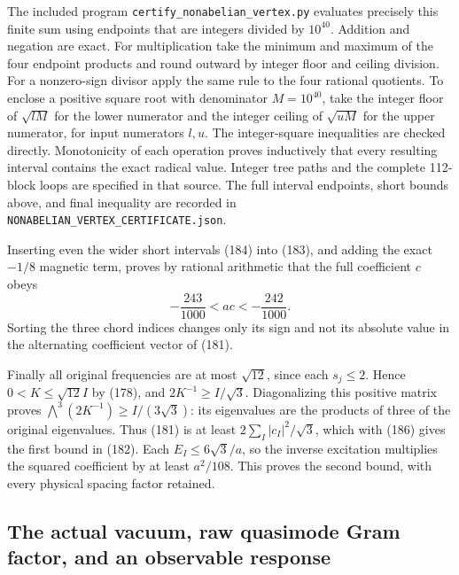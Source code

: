 \documentclass[11pt]{article}
\begin{document}
The included program \texttt{certify\_nonabelian\_vertex.py}
evaluates precisely this finite sum using endpoints that are integers
divided by $10^{40}$. Addition and negation are exact. For multiplication
take the minimum and maximum of the four endpoint products and round
outward by integer floor and ceiling division. For a nonzero-sign
divisor apply the same rule to the four rational quotients. To enclose
a positive square root with denominator $M=10^{40}$, take the integer
floor of $\sqrt{lM}$ for the lower numerator and the integer ceiling
of $\sqrt{uM}$ for the upper numerator, for input numerators $l,u$.
The integer-square inequalities are checked directly. Monotonicity
of each operation proves inductively that every resulting interval
contains the exact radical value. Integer tree paths and the complete
112-block loops are specified in that source. The full interval
endpoints, short bounds above, and final inequality are recorded in
\texttt{NONABELIAN\_VERTEX\_CERTIFICATE.json}.

Inserting even the wider short intervals
(184) into
(183), and adding the exact
$-1/8$ magnetic term, proves by rational arithmetic that the
full coefficient $c$ obeys
\begin{equation}\label{eq:vertex-strict-coefficient}
 -\frac{243}{1000}<ac<-\frac{242}{1000}.
\end{equation}
Sorting the three chord indices changes only its sign and not its
absolute value in the alternating coefficient vector of
(181).

Finally all original frequencies are at most $\sqrt{12}$, since
each $s_j\le2$. Hence $0<K\le\sqrt{12}I$ by
(178), and $2K^{-1}\ge I/\sqrt3$.
Diagonalizing this positive matrix proves
$\bigwedge^3(2K^{-1})\ge I/(3\sqrt3)$: its eigenvalues are
the products of three of the original eigenvalues. Thus
(181) is at least
$2\sum_I|c_I|^2/\sqrt3$, which with
(186) gives the first bound in
(182). Each $E_I\le6\sqrt3/a$, so
the inverse excitation multiplies the squared coefficient by at
least $a^2/108$. This proves the second bound, with every physical
spacing factor retained.



\subsection{The actual vacuum, raw quasimode Gram factor, and an observable response}
\end{document}
